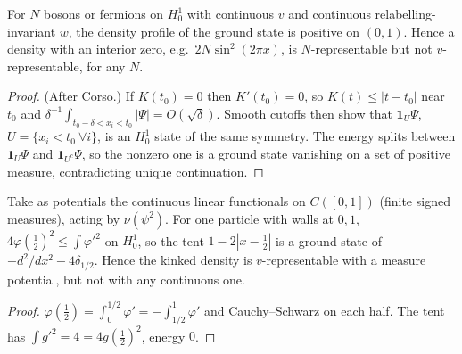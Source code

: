 \begin{theorem}
  \label{thm:line_positive}
  \leanok
  For $N$ bosons or fermions on $H^1_0$ with continuous $v$ and continuous relabelling-invariant $w$, the density
  profile of the ground state is positive on $(0,1)$. Hence a density with an interior zero, e.g.\ $2N\sin^2(2\pi x)$,
  is $N$-representable but not $v$-representable, for any $N$.
\end{theorem}
\begin{proof}
  \leanok
  (After Corso.) If $K(t_0)=0$ then $K'(t_0)=0$, so $K(t)\le|t-t_0|$ near $t_0$ and
  $\delta^{-1}\int_{t_0-\delta<x_i<t_0}|\Psi|=O(\sqrt\delta)$. Smooth cutoffs then show that $\mathbf 1_U\Psi$,
  $U=\{x_i<t_0\ \forall i\}$, is an $H^1_0$ state of the same symmetry. The energy splits between $\mathbf 1_U\Psi$ and
  $\mathbf 1_{U^c}\Psi$, so the nonzero one is a ground state vanishing on a set of positive measure, contradicting
  unique continuation.
\end{proof}

\begin{theorem}
  \label{thm:line_measure_kink}
  \leanok
  Take as potentials the continuous linear functionals on $C([0,1])$ (finite signed measures), acting by $\nu(\psi^2)$.
  For one particle with walls at $0,1$, $4\varphi(\tfrac12)^2\le\int\varphi'^2$ on $H^1_0$, so the tent $1-2|x-\tfrac12|$
  is a ground state of $-d^2/dx^2-4\delta_{1/2}$. Hence the kinked density is $v$-representable with a measure
  potential, but not with any continuous one.
\end{theorem}
\begin{proof}
  \leanok
  $\varphi(\tfrac12)=\int_0^{1/2}\varphi'=-\int_{1/2}^1\varphi'$ and Cauchy--Schwarz on each half. The tent has
  $\int g'^2=4=4g(\tfrac12)^2$, energy $0$.
\end{proof}


